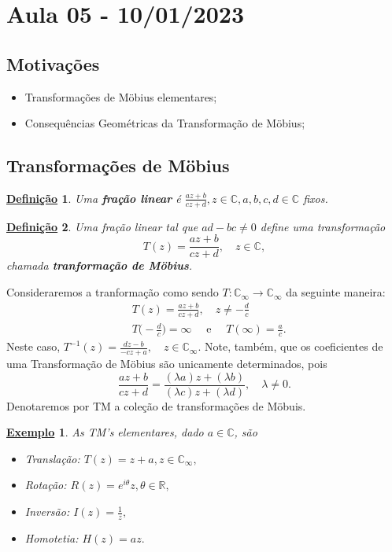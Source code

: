 \documentclass{article}
\newtheorem*{def*}{\underline{Defini\c c\~ao}}
\newtheorem{example}{\underline{Exemplo}}[section]
\begin{document}
  \section{Aula 05 - 10/01/2023}
  \subsection{Motiva\c c\~oes}
  \begin{itemize}
    \item Transforma\c c\~oes de M\"{o}bius elementares;
    \item Consequ\^encias Geom\'etricas da Transforma\c c\~ao de M\"{o}bius;
  \end{itemize}
  \subsection{Transforma\c c\~oes de M\"{o}bius}
  \begin{def*}
    Uma \textbf{fra\c c\~ao linear} \'e $\frac{az + b}{cz + d}, z\in \mathbb{C}, a, b, c, d\in \mathbb{C}$ fixos.
  \end{def*}
  \begin{def*}
    Uma fra\c c\~ao linear tal que $ad-bc\neq0$ define uma transforma\c c\~ao
    $$
    T(z) = \frac{az + b}{cz + d}, \quad z\in \mathbb{C},
    $$
    chamada \textbf{tranforma\c c\~ao de M\"{o}bius}.
  \end{def*}
  Consideraremos a tranforma\c c\~ao como sendo $T:\mathbb{C}_{\infty}\rightarrow \mathbb{C}_{\infty}$ da seguinte
  maneira:
  \begin{align*}
&T(z) = \frac{az + b}{cz + d}, \quad z\neq -\frac{d}{c} \\
&T\biggl(-\frac{d}{c}\biggr) = \infty \quad\text{ e }\quad T(\infty) = \frac{a}{c}.
  \end{align*}
  Neste caso, $T ^{-1}(z) = \displaystyle\frac{dz - b}{-cz + a}, \quad z\in \mathbb{C}_{\infty}.$ Note, tamb\'em, que os coeficientes
  de uma Transforma\c c\~ao de M\"{o}bius s\~ao unicamente determinados, pois 
  $$
  \frac{az + b}{cz + d} = \frac{(\lambda a)z + (\lambda b)}{(\lambda c)z + (\lambda d)}, \quad \lambda\neq0.
  $$
  Denotaremos por TM a cole\c c\~ao de transforma\c c\~oes de M\"{o}buis.
  \begin{example}
    As TM's elementares, dado $a\in \mathbb{C}$, s\~ao
    \begin{itemize}
      \item[-] Transla\c c\~ao: $T(z) = z + a, z\in \mathbb{C}_{\infty},$
      \item[-] Rota\c c\~ao: $R(z) = e^{i \theta}z, \theta\in \mathbb{R},$
      \item[-] Invers\~ao: $I(z) = \frac{1}{z},$
      \item[-] Homotetia: $H(z) = az.$
    \end{itemize}
  \end{example}
\end{document}
